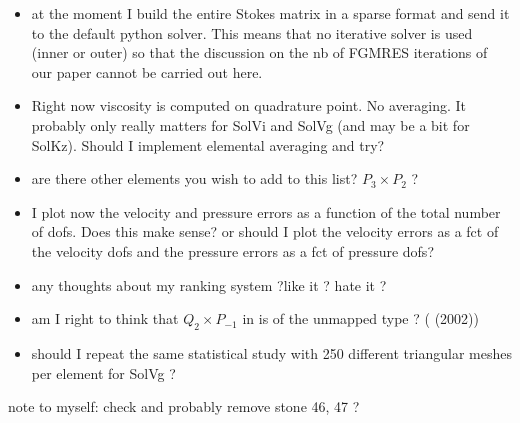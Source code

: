 \begin{itemize}
\item at the moment I build the entire Stokes matrix in a sparse format and send it to the default 
python solver. This means that no iterative solver is used (inner or outer) so that the discussion 
on the nb of FGMRES iterations of our paper cannot be carried out here. 
\item Right now viscosity is computed on quadrature point. No averaging. It probably only really matters 
for SolVi and SolVg (and may be a bit for SolKz). Should I implement elemental averaging and try?  
\item are there other elements you wish to add to this list? $P_3\times P_2$ ? 
\item I plot now the velocity and pressure errors as a function of the total number of dofs. 
Does this make sense? or should I plot the velocity errors as a fct of the velocity dofs and 
the pressure errors  as a fct of pressure dofs?
\item any thoughts about my ranking system ?like it ? hate it ?
\item am I right to think that $Q_2\times P_{-1}$ in \aspect is of the unmapped type ?  (\textcite{boga02} (2002))
\item should I repeat the same statistical study with 250 different triangular meshes per element for SolVg ? 
\end{itemize}

\vspace{0.5cm}

note to myself: check and probably remove stone 46, 47 ?
